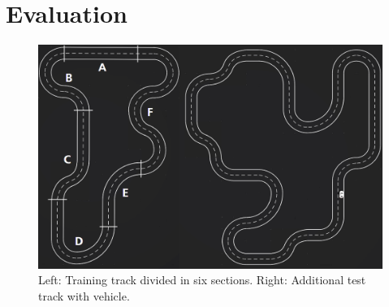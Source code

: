 
\section{Evaluation}\label{sec:evaluation}


\begin{figure}[!t]
\centering
\includegraphics[scale=0.24]{../plots/track_both}
\caption{Left: Training track divided in six sections. Right: Additional test track with vehicle.}
\label{track}
\end{figure}

